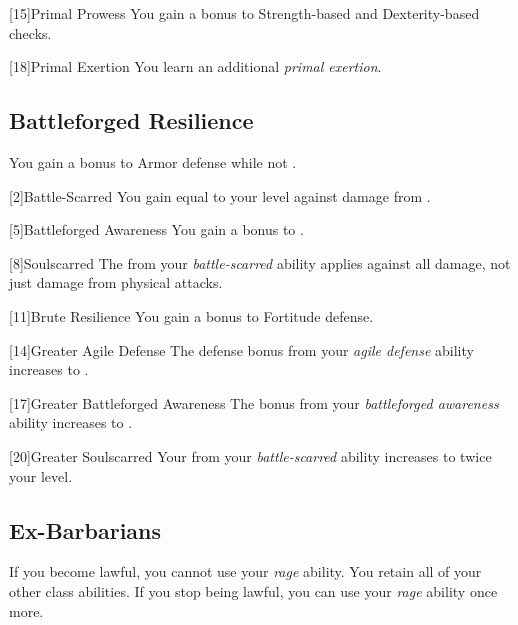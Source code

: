         [15]{Primal Prowess}
        You gain a  bonus to Strength-based and Dexterity-based checks.

        [18]{Primal Exertion}
        You learn an additional \textit{primal exertion}.

    \subsection{Battleforged Resilience}
         You gain a  bonus to Armor defense while not .

        [2]{Battle-Scarred} You gain  equal to your level against damage from .

        [5]{Battleforged Awareness} You gain a  bonus to .

        [8]{Soulscarred} The  from your \textit{battle-scarred} ability applies against all damage, not just damage from physical attacks.

        [11]{Brute Resilience}
        You gain a  bonus to Fortitude defense.

        [14]{Greater Agile Defense}
        The defense bonus from your \textit{agile defense} ability increases to .

        [17]{Greater Battleforged Awareness}
        The bonus from your \textit{battleforged awareness} ability increases to .

        [20]{Greater Soulscarred}
        Your  from your \textit{battle-scarred} ability increases to twice your level.

    \subsection{Ex-Barbarians}
        If you become lawful, you cannot use your \textit{rage} ability.
        You retain all of your other class abilities.
        If you stop being lawful, you can use your \textit{rage} ability once more.

